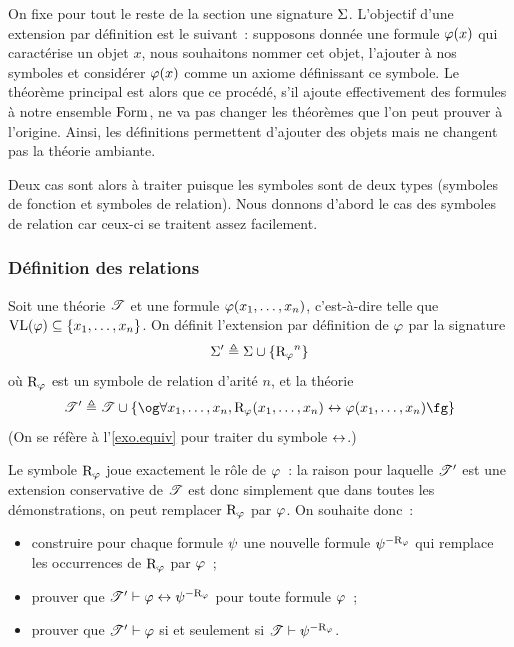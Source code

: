 On fixe pour tout le reste de la section une signature $\Sigma$. L'objectif d'une
extension par définition est le suivant~: supposons donnée une formule
$\varphi(x)$ qui caractérise un objet $x$, nous souhaitons nommer cet objet,
l'ajouter à nos symboles et considérer $\varphi(x)$ comme un axiome définissant
ce symbole. Le théorème principal est alors que ce procédé, s'il ajoute
effectivement des formules à notre ensemble $\operatorname{Form}$, ne va pas changer les
théorèmes que l'on peut prouver à l'origine. Ainsi, les définitions permettent
d'ajouter des objets mais ne changent pas la théorie ambiante.

Deux cas sont alors à traiter puisque les symboles sont de deux types (symboles
de fonction et symboles de relation). Nous donnons d'abord le cas des symboles
de relation car ceux-ci se traitent assez facilement.

\subsubsection{Définition des relations}

\begin{definition}
  \label{def.ext.def.rel}
  Soit une théorie $\mathscr T$ et une formule $\varphi(x_1,\ldots,x_n)$, c'est-à-dire
  telle que $\operatorname{VL}(\varphi) \subseteq \{x_1,\ldots,x_n\}$. On définit l'extension
  par définition de $\varphi$ par la signature
  \[\Sigma' \triangleq \Sigma \cup \{{\mathrm{R}_{\varphi}}^n\}\]
  où $\mathrm{R}_{\varphi}$ est un symbole de relation d'arité $n$, et la théorie
  \[\varT' \defeq \varT \cup
    \{\ogM \forall x_1,\ldots,x_n, \symbRF(x_1,\ldots,x_n)
    \iffS \varFF(x_1,\ldots,x_n)\fgM\}\]
  (On se réfère à l'\cref{exo.equiv} pour traiter du symbole $\mathrel{\leftrightarrow}$.)
\end{definition}

Le symbole $\mathrm{R}_{\varphi}$ joue exactement le rôle de $\varphi$~: la raison pour
laquelle $\mathscr T'$ est une extension conservative de $\mathscr T$ est donc simplement
que dans toutes les démonstrations, on peut remplacer $\mathrm{R}_{\varphi}$ par $\varphi$.
On souhaite donc~:
\begin{itemize}
\item construire pour chaque formule $\psi$ une nouvelle formule ${\psi}^{-\mathrm{R}_{\varphi}}$ qui
  remplace les occurrences de $\mathrm{R}_{\varphi}$ par $\varphi$~;
\item prouver que $\mathscr T' \vdash \varphi \mathrel{\leftrightarrow} {\psi}^{-\mathrm{R}_{\varphi}}$ pour toute
  formule $\varphi$~;
\item prouver que $\mathscr T' \vdash \varphi$ si et seulement si
  $\mathscr T \vdash {\psi}^{-\mathrm{R}_{\varphi}}$.
\end{itemize}

